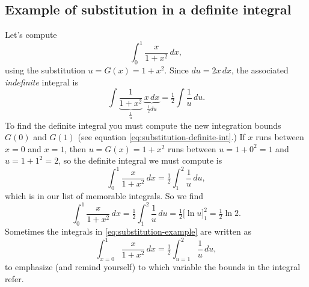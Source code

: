 \subsection{Example of substitution in a definite integral}
Let's compute
\[
\int_0^1 \frac{x}{1+x^2}\,d x,
\]
using the substitution $u=G(x)=1+x^2$. Since $d u = 2x\,d x$, the
associated \emph{indefinite} integral is
\[
\int \underbrace{\frac{1}{1+x^2}}_{\frac1u} \, \underbrace{x\,d
  x}_{\tfrac12 d u} = \tfrac12\int \frac 1u \, d u.
\]
To find the definite integral you must compute the new integration bounds $G(0)$
and $G(1)$ (see equation \eqref{eq:substitution-definite-int}.) If $x$ runs
between $x=0$ and $x=1$, then $u=G(x)=1+x^2$ runs between $u=1+0^2=1$ and
$u=1+1^2=2$, so the definite integral we must compute is
\begin{equation}\label{eq:substitution-example}
  \int_0^1 \frac{x}{1+x^2}\,d x 
  = \tfrac12\int_1^2 \frac 1u \, d u,
\end{equation}
which is in our list of memorable integrals. So we find
\[
\int_0^1 \frac{x}{1+x^2}\,d x = \tfrac12\int_1^2 \frac 1u \, d u
=\tfrac12\bigl[\ln u\bigr]_1^2 = \tfrac12\ln 2.
\]
Sometimes the integrals in \eqref{eq:substitution-example} are written
as
\[
\int_{x=0}^1 \frac{x}{1+x^2}\,d x = \tfrac12\int_{u=1}^2 \frac 1u \, d
u,
\]
to emphasize (and remind yourself) to which variable the bounds in the
integral refer.


